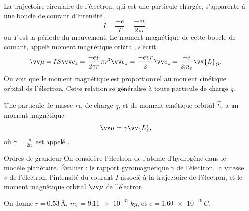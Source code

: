 \documentclass[12pt,fancy]{cours}
\begin{document}
La trajectoire circulaire de l'électron, qui est une particule chargée, s'apparente à une boucle de courant d'intensité 
\begin{equation}
  I = \frac{-e}{T} = \frac{-e v}{2\pi r},
\end{equation}
où $T$ est la période du mouvement. Le moment magnétique de cette boucle de courant, appelé moment magnétique orbital, s'écrit
\begin{equation}
\M=IS\ez=\frac{-ev}{2\pi r}\pi r^2\ez=\frac{-evr}{2}\ez=\frac{-e}{2m_e}\vv{L}_O.
\end{equation}
On voit que le moment magnétique est proportionnel au moment cinétique orbital de l'électron.
Cette relation se généralise à toute particule de charge $q$.
\begin{theorem}\label{form:gyro}
  Une particule de masse $m$, de charge $q$, et de moment cinétique orbital $\Vec{L}$, a un moment magnétique
  $$
  \M=\gamma\vv{L},
  $$
  où $\gamma = \frac{q}{2m}$ est appelé .
\end{theorem}

\begin{exemple}{Ordres de grandeur}
  On considère l'électron de l'atome d'hydrogène dans le modèle planétaire.
 Évaluer : le rapport gyromagnétique $\gamma$ de l'électron, la vitesse $v$ de l'électron, l'intensité du courant $I$ associé à la trajectoire de l'électron, et le moment magnétique orbital $\M$ de l'électron. 
 
 On donne $r = \SI{0.53}{\angstrom}$, $m_e = \SI{9.11e-31}{kg}$, et $e = \SI{1.60e-19}{C}$.

\end{exemple}
\end{document}
